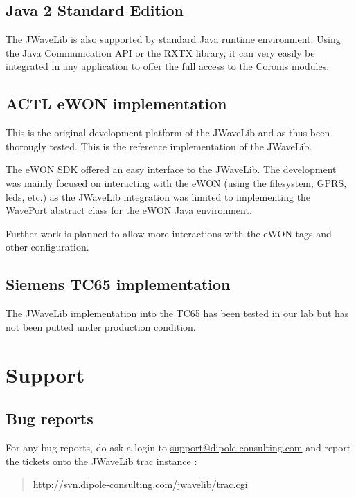 \documentclass[a4paper,10pt,english]{sphinxmanual}
\begin{document}
\section{Java 2 Standard Edition}
\label{implementation:java-2-standard-edition}
The JWaveLib is also supported by standard Java runtime environment. Using the
Java Communication API or the RXTX library, it can very easily be integrated in
any application to offer the full access to the Coronis modules.


\section{ACTL eWON implementation}
\label{implementation:actl-ewon-implementation}
This is the original development platform of the JWaveLib and as thus been
thorougly tested. This is the reference implementation of the JWaveLib.

The eWON SDK offered an easy interface to the JWaveLib. The development was mainly focused on interacting with the eWON (using the filesystem, GPRS, leds, etc.) as the JWaveLib integration was limited to implementing the WavePort abstract class for the eWON Java environment.

Further work is planned to allow more interactions with the eWON tags and other configuration.


\section{Siemens TC65 implementation}
\label{implementation:siemens-tc65-implementation}
The JWaveLib implementation into the TC65 has been tested in our lab but has
not been putted under production condition.


\chapter{Support}
\label{support:support}\label{support::doc}

\section{Bug reports}
\label{support:bug-reports}
For any bug reports, do ask a login to \href{mailto:support@dipole-consulting.com}{support@dipole-consulting.com} and report
the tickets onto the JWaveLib trac instance :
\begin{quote}

\href{http://svn.dipole-consulting.com/jwavelib/trac.cgi}{http://svn.dipole-consulting.com/jwavelib/trac.cgi}
\end{quote}
\end{document}
